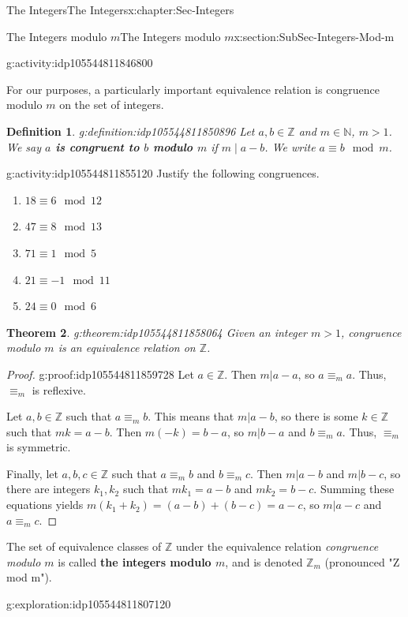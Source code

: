 \documentclass[oneside,10pt,]{book}
\newcommand{\terminology}[1]{\textbf{#1}}
\numberwithin{equation}{section}
\def\Z{{\mathbb Z}}
\def\N{{\mathbb N}}
\newtheorem{theorem}{Theorem}[section]
\newtheorem{definition}[theorem]{Definition}
\begin{document}
\begin{chapterptx}{The Integers}{}{The Integers}{}{}{x:chapter:Sec-Integers}
\begin{sectionptx}{The Integers modulo \(m\)}{}{The Integers modulo \(m\)}{}{}{x:section:SubSec-Integers-Mod-m}
\begin{activity}{}{g:activity:idp105544811846800}
\end{activity}%
For our purposes, a particularly important equivalence relation is congruence modulo \(m\) on the set of integers.%
\begin{definition}{}{g:definition:idp105544811850896}%
%
Let \(a,b\in \Z\) and \(m \in \N\), \(m > 1\). We say \terminology{\(a\) is congruent to \(b\) modulo \(m\)} if \(m\mid a-b\). We write \(a \equiv b\mod m\).%
\end{definition}
\begin{activity}{}{g:activity:idp105544811855120}%
Justify the following congruences.%
\begin{enumerate}
\item{}\(\displaystyle 18 \equiv 6\mod 12\)%
\item{}\(\displaystyle 47 \equiv 8\mod 13\)%
\item{}\(\displaystyle 71 \equiv 1\mod 5\)%
\item{}\(\displaystyle 21 \equiv -1 \mod 11\)%
\item{}\(\displaystyle 24 \equiv 0\mod 6\)%
\end{enumerate}
%
\end{activity}%
\begin{theorem}{}{}{g:theorem:idp105544811858064}%
Given an integer \(m > 1\), congruence modulo \(m\) is an equivalence relation on \(\Z\).%
\end{theorem}
\begin{proof}{}{g:proof:idp105544811859728}
Let \(a\in \Z\). Then \(m|a-a\), so \(a \equiv_m a\). Thus, \(\equiv_m\) is reflexive.%
\par
Let \(a,b\in \Z\) such that \(a\equiv_m b\). This means that \(m|a-b\), so there is some \(k\in \Z\) such that \(mk = a-b\). Then \(m(-k) = b-a\), so \(m|b-a\) and \(b \equiv_m a\). Thus, \(\equiv_m\) is symmetric.%
\par
Finally, let \(a,b,c\in \Z\) such that \(a\equiv_m b\) and \(b\equiv_m c\). Then \(m|a-b\) and \(m|b-c\), so there are integers \(k_1, k_2\) such that \(m k_1 = a-b\) and \(m k_2 = b-c\). Summing these equations yields \(m(k_1 + k_2) = (a-b) + (b-c) = a-c\), so \(m|a-c\) and \(a\equiv_m c\).%
\end{proof}
\index{\(\Z_m\)} The set of equivalence classes of \(\Z\) under the equivalence relation \emph{congruence modulo \(m\)} is called \terminology{the integers modulo \(m\)}, and is denoted \(\Z_m\) (pronounced "Z mod m").%
\begin{exploration}{}{g:exploration:idp105544811807120}%

\end{exploration}
\end{sectionptx}
\end{chapterptx}
\end{document}
